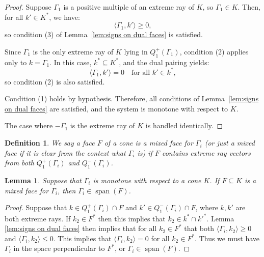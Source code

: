 \documentclass{article}
\newtheorem{lem}{Lemma}
\newtheorem{define}{Definition}
\newcommand{\spans}{\operatorname{span}}
\begin{document}
\begin{proof}
Suppose \( \Gamma_1 \) is a positive multiple of an extreme ray of \( K \), so \( \Gamma_1 \in K \). Then, for all \( k' \in K^* \), we have:
\[
\langle \Gamma_1, k' \rangle \geq 0,
\]
so condition (3) of Lemma~\ref{lem:signs on dual faces} is satisfied.

Since \( \Gamma_1 \) is the only extreme ray of \( K \) lying in \( Q_1^+(\Gamma_1) \), condition (2) applies only to \( k = \Gamma_1 \). In this case, \( k^* \subseteq K^* \), and the dual pairing yields:
\[
\langle \Gamma_1, k' \rangle = 0 \quad \text{for all } k' \in k^*,
\]
so condition (2) is also satisfied.

Condition (1) holds by hypothesis. Therefore, all conditions of Lemma~\ref{lem:signs on dual faces} are satisfied, and the system is monotone with respect to \( K \).

The case where \( -\Gamma_1 \) is the extreme ray of \( K \) is handled identically.
\end{proof}




\begin{define}
    We say a face $F$ of a cone is a \textit{mixed face for $\Gamma_i$} (or just a \textit{mixed face} if it is clear from the context what $\Gamma_i$ is) if $F$ contains extreme ray vectors from both $Q_1^+(\Gamma_i)$ and $Q_1^-(\Gamma_i)$.
\end{define}

\begin{lem}
\label{lem:contained in mixed faces}
    Suppose that $\Gamma_i$ is monotone with respect to a cone $K$. If $F \subseteq K$ is a mixed face for $\Gamma_i$, then $\Gamma_i \in \spans(F)$.
\end{lem}

\begin{proof}
    Suppose that $k \in Q^+_1(\Gamma_i) \cap F$ and $k' \in Q^-_1(\Gamma_i) \cap F$, where $k,k'$ are both extreme rays. If $k_2 \in F^*$ then this implies that $k_2 \in k^* \cap k'^*$. Lemma \ref{lem:signs on dual faces} then implies that for all $k_2 \in F^*$ that both $\langle \Gamma_i, k_2 \rangle \geq 0$ and $\langle \Gamma_i, k_2 \rangle \leq 0$. This implies that $\langle \Gamma_i, k_2 \rangle = 0$ for all $k_2 \in F^*$. Thus we must have $\Gamma_i$ in the space perpendicular to $F^*$, or $\Gamma_i \in \spans(F)$.
\end{proof}
\end{document}
